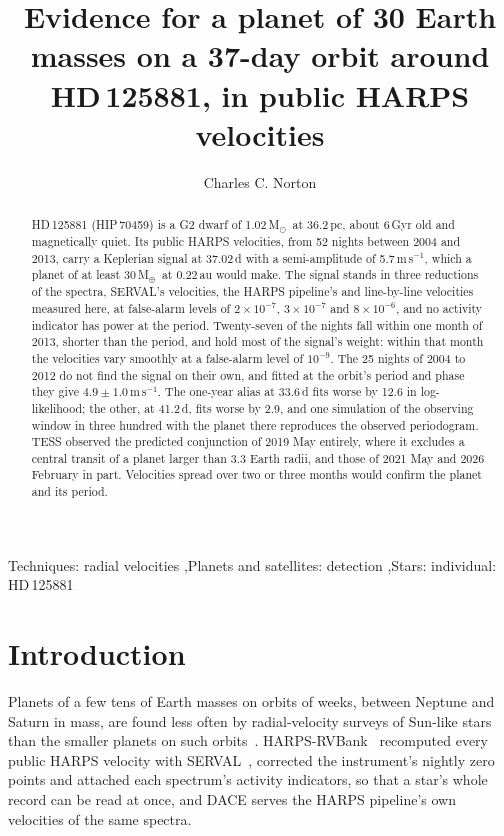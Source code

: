 \documentclass[3p,11pt]{elsarticle}
\newcommand{\ms}{m\,s$^{-1}$}
\newcommand{\Msun}{M$_\odot$}
\newcommand{\Mearth}{M$_\oplus$}
\begin{document}
\begin{frontmatter}

\title{Evidence for a planet of 30 Earth masses on a 37-day orbit around HD\,125881, in public HARPS
velocities}

\author{Charles C. Norton}

\begin{abstract}
HD\,125881 (HIP\,70459) is a G2 dwarf of 1.02\,\Msun\ at 36.2\,pc, about 6\,Gyr old and magnetically
quiet. Its public HARPS velocities, from 52 nights between 2004 and 2013, carry a Keplerian signal at
37.02\,d with a semi-amplitude of 5.7\,\ms, which a planet of at least 30\,\Mearth\ at 0.22\,au would
make. The signal stands in three reductions of the spectra, SERVAL's velocities, the HARPS pipeline's
and line-by-line velocities measured here, at false-alarm levels of $2\times10^{-7}$, $3\times10^{-7}$
and $8\times10^{-6}$, and no activity indicator has power at the period. Twenty-seven of the
nights fall within one month of 2013, shorter than the period, and hold most of the signal's weight:
within that month the velocities vary smoothly at a false-alarm level of $10^{-9}$. The 25 nights of
2004 to 2012 do not find the signal on their own, and fitted at the orbit's period and phase they
give $4.9 \pm 1.0$\,\ms. The one-year alias at 33.6\,d fits worse by 12.6 in log-likelihood; the
other, at 41.2\,d, fits worse by 2.9, and one simulation of the observing window in three hundred
with the planet there reproduces the observed periodogram. TESS observed the predicted conjunction of
2019 May entirely, where it excludes a central transit of a planet larger than 3.3 Earth radii, and
those of 2021 May and 2026 February in part. Velocities spread over two or three months would confirm
the planet and its period.
\end{abstract}

\begin{keyword}
Techniques: radial velocities \sep Planets and satellites: detection \sep Stars: individual: HD\,125881
\end{keyword}

\end{frontmatter}

\section{Introduction}\label{sec:intro}

Planets of a few tens of Earth masses on orbits of weeks, between Neptune and Saturn in mass, are
found less often by radial-velocity surveys of Sun-like stars than the smaller planets on such
orbits~\cite{Howard2010}. HARPS-RVBank~\cite{Trifonov2020} recomputed every public HARPS velocity with
SERVAL~\cite{Zechmeister2018}, corrected the instrument's nightly zero points and attached each
spectrum's activity indicators, so that a star's whole record can be read at once, and DACE serves the
HARPS pipeline's own velocities of the same spectra.
\end{document}
